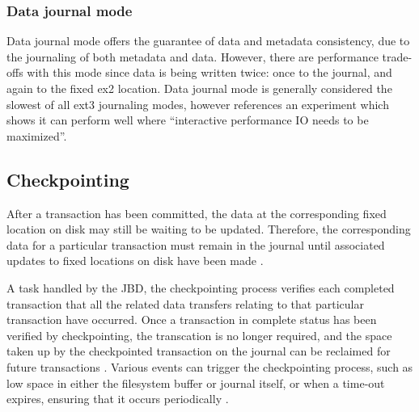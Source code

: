 \subsubsection{Data journal mode}

Data journal mode offers the guarantee of data and metadata consistency, due to the journaling of both metadata and data. However, there are performance trade-offs with this mode since data is being written twice: once to the journal, and again to the fixed ex2 location. Data journal mode is generally considered the slowest of all ext3 journaling modes, however \citet[p. 3]{Robbins2001b} references an experiment which shows it can perform well where ``interactive performance IO needs to be maximized''.

\subsection{Checkpointing}

After a transaction has been committed, the data at the corresponding fixed location on disk may still be waiting to be updated. Therefore, the corresponding data for a particular transaction must remain in the journal until associated updates to fixed locations on disk have been made \citep{Tweedie1998}.

A task handled by the JBD, the checkpointing process verifies each completed transaction that all the related data transfers relating to that particular transaction have occurred. Once a transaction in complete status has been verified by checkpointing, the transcation is no longer required, and the space taken up by the checkpointed transaction on the journal can be reclaimed for future transactions \citep{Tweedie2000, Tweedie1998, Prabhakaran2005a, Devlisden2011, Bovet2006}. Various events can trigger the checkpointing process, such as low space in either the filesystem buffer or journal itself, or when a time-out expires, ensuring that it occurs periodically \citep{Prabhakaran2005a}.



